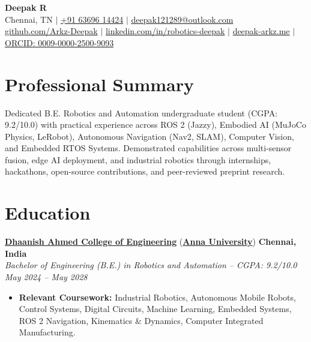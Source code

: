 \documentclass[letterpaper,10pt]{article}
\begin{document}
\begin{center}
    {\LARGE \textbf{Deepak R}} \\ \vspace{3pt}
    \small Chennai, TN $|$ \href{tel:+916369614424}{+91 63696 14424} $|$ \href{mailto:deepak121289@outlook.com}{deepak121289@outlook.com} \\ \vspace{2pt}
    \href{https://github.com/Arkz-Deepak}{github.com/Arkz-Deepak} $|$ 
    \href{https://linkedin.com/in/robotics-deepak}{linkedin.com/in/robotics-deepak} $|$ 
    \href{https://deepak-arkz.me}{deepak-arkz.me} $|$
    \href{https://orcid.org/0009-0000-2500-9093}{ORCID: 0009-0000-2500-9093}
\end{center}
\vspace{-6pt}

\section{Professional Summary}
\small{Dedicated B.E. Robotics and Automation undergraduate student (CGPA: 9.2/10.0) with practical experience across ROS 2 (Jazzy), Embodied AI (MuJoCo Physics, LeRobot), Autonomous Navigation (Nav2, SLAM), Computer Vision, and Embedded RTOS Systems. Demonstrated capabilities across multi-sensor fusion, edge AI deployment, and industrial robotics through internships, hackathons, open-source contributions, and peer-reviewed preprint research.}

\section{Education}
\noindent
\href{https://dhaanish.org}{\textbf{Dhaanish Ahmed College of Engineering}} (\href{https://www.annauniv.edu}{\textbf{Anna University}}) \hfill \textbf{Chennai, India} \\
\textit{Bachelor of Engineering (B.E.) in Robotics and Automation -- CGPA: 9.2/10.0} \hfill \textit{May 2024 -- May 2028} \\
\begin{itemize}
    \item \textbf{Relevant Coursework:} Industrial Robotics, Autonomous Mobile Robots, Control Systems, Digital Circuits, Machine Learning, Embedded Systems, ROS 2 Navigation, Kinematics \& Dynamics, Computer Integrated Manufacturing.
\end{itemize}
\end{document}
